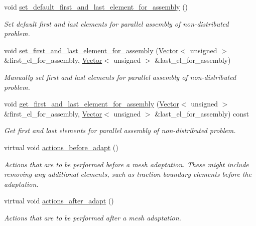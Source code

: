 \begin{DoxyCompactItemize}
void \hyperlink{classoomph_1_1Problem_ab002dc7a6faf97a1bfcd9c098a04f840}{set\+\_\+default\+\_\+first\+\_\+and\+\_\+last\+\_\+element\+\_\+for\+\_\+assembly} ()
\begin{DoxyCompactList}\small\item\em Set default first and last elements for parallel assembly of non-\/distributed problem. \end{DoxyCompactList}\item 
void \hyperlink{classoomph_1_1Problem_ac4dec80ab9a6834e10b2c2b0119e7133}{set\+\_\+first\+\_\+and\+\_\+last\+\_\+element\+\_\+for\+\_\+assembly} (\hyperlink{classoomph_1_1Vector}{Vector}$<$ unsigned $>$ \&first\+\_\+el\+\_\+for\+\_\+assembly, \hyperlink{classoomph_1_1Vector}{Vector}$<$ unsigned $>$ \&last\+\_\+el\+\_\+for\+\_\+assembly)
\begin{DoxyCompactList}\small\item\em Manually set first and last elements for parallel assembly of non-\/distributed problem. \end{DoxyCompactList}\item 
void \hyperlink{classoomph_1_1Problem_a22b3818d62b66e5cb52d72dcccc037fa}{get\+\_\+first\+\_\+and\+\_\+last\+\_\+element\+\_\+for\+\_\+assembly} (\hyperlink{classoomph_1_1Vector}{Vector}$<$ unsigned $>$ \&first\+\_\+el\+\_\+for\+\_\+assembly, \hyperlink{classoomph_1_1Vector}{Vector}$<$ unsigned $>$ \&last\+\_\+el\+\_\+for\+\_\+assembly) const
\begin{DoxyCompactList}\small\item\em Get first and last elements for parallel assembly of non-\/distributed problem. \end{DoxyCompactList}\item 
virtual void \hyperlink{classoomph_1_1Problem_a6130d5c9a762cdd1569919a601620796}{actions\+\_\+before\+\_\+adapt} ()
\begin{DoxyCompactList}\small\item\em Actions that are to be performed before a mesh adaptation. These might include removing any additional elements, such as traction boundary elements before the adaptation. \end{DoxyCompactList}\item 
virtual void \hyperlink{classoomph_1_1Problem_ada40ec6730506c01109622c8383fe36e}{actions\+\_\+after\+\_\+adapt} ()
\begin{DoxyCompactList}\small\item\em Actions that are to be performed after a mesh adaptation. \end{DoxyCompactList}\item 

\end{DoxyCompactItemize}
